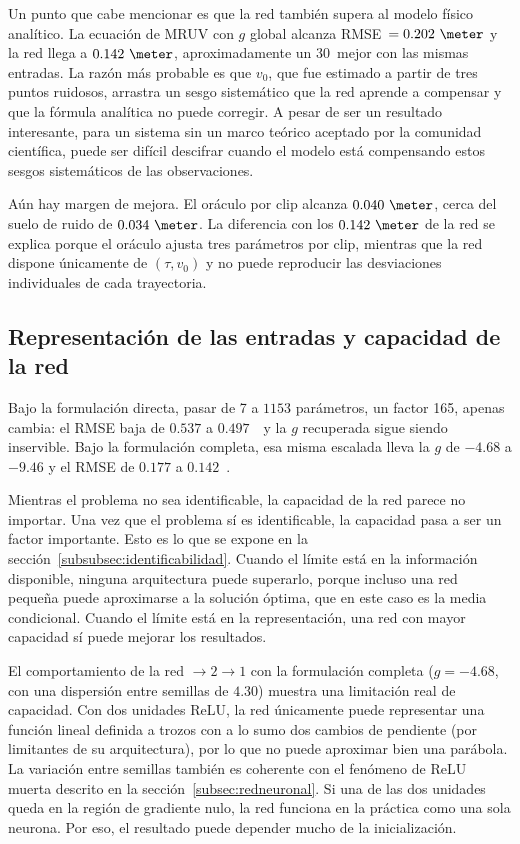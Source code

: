 \documentclass[titlepage,11pt]{article}
\providecommand{\num}[1]{\ensuremath{#1}}
\providecommand{\SI}[2]{#1\,#2}
\providecommand{\percent}{\char37\relax}
\begin{document}
Un punto que cabe mencionar es que la red también supera al modelo físico
analítico. La ecuación de MRUV con $g$ global alcanza RMSE~$=\num{0.202}~\meter$ y la red llega a $\num{0.142}~\meter$, aproximadamente un \SI{30}{\percent} mejor con las mismas entradas. La razón más probable es que $v_0$, que fue estimado a partir de tres puntos ruidosos, arrastra un sesgo sistemático
que la red aprende a compensar y que la fórmula analítica no puede corregir.
A pesar de ser un resultado interesante, para un sistema sin un marco teórico aceptado por la comunidad
científica, puede ser difícil descifrar cuando el modelo está compensando estos sesgos sistemáticos de las observaciones.

Aún hay margen de mejora. El oráculo por clip alcanza
$\num{0.040}~\meter$, cerca del suelo de ruido de $\num{0.034}~\meter$. La
diferencia con los $\num{0.142}~\meter$ de la red se explica porque el oráculo
ajusta tres parámetros por clip, mientras que la red dispone únicamente de
$(\tau,v_0)$ y no puede reproducir las desviaciones individuales de cada
trayectoria.

\subsection{Representación de las entradas y capacidad de la red}
\label{subsec:capacidad}

Bajo la formulación directa, pasar de 7 a \num{1153} parámetros, un factor 165,
apenas cambia: el RMSE baja de \num{0.537} a \num{0.497}~\meter\ y la $g$
recuperada sigue siendo inservible. Bajo la formulación completa, esa misma
escalada lleva la $g$ de $\num{-4.68}$ a $\num{-9.46}$ y el RMSE de \num{0.177}
a \num{0.142}~\meter.

Mientras el problema no sea identificable, la capacidad de la red parece no importar. Una vez que el problema sí es identificable, la capacidad pasa a ser un factor importante. Esto es lo que se expone en la sección~\ref{subsubsec:identificabilidad}. Cuando el límite está en la información disponible, ninguna arquitectura puede superarlo, porque incluso una red pequeña puede aproximarse a la solución óptima, que en este caso es la media condicional. Cuando el límite está en la representación, una red con mayor capacidad sí puede mejorar los resultados.

El comportamiento de la red $\to2\to1$ con la formulación completa ($g=\num{-4.68}$, con una dispersión entre semillas de $\num{4.30}$) muestra una limitación real de capacidad. Con dos unidades ReLU, la red únicamente puede representar una función lineal definida a trozos con a lo sumo dos cambios de pendiente (por limitantes de su arquitectura), por lo que no puede aproximar bien una parábola. La variación entre semillas también es coherente con el fenómeno de ReLU muerta descrito en la sección~\ref{subsec:redneuronal}. Si una de las dos unidades queda en la región de gradiente nulo, la red funciona en la práctica como una sola neurona. Por eso, el resultado puede depender mucho de la inicialización.
\end{document}
